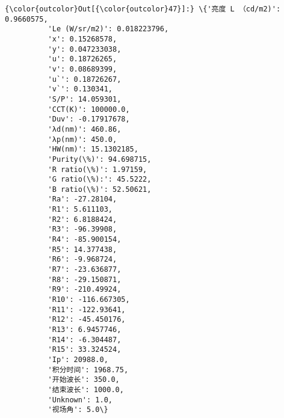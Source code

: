 \documentclass[11pt]{article}
\begin{document}
\begin{Verbatim}[commandchars=\\\{\}]
{\color{outcolor}Out[{\color{outcolor}47}]:} \{'亮度 L （cd/m2)': 0.9660575,
          'Le (W/sr/m2)': 0.018223796,
          'x': 0.15268578,
          'y': 0.047233038,
          'u': 0.18726265,
          'v': 0.08689399,
          'u`': 0.18726267,
          'v`': 0.130341,
          'S/P': 14.059301,
          'CCT(K)': 100000.0,
          'Duv': -0.17917678,
          'λd(nm)': 460.86,
          'λp(nm)': 450.0,
          'HW(nm)': 15.1302185,
          'Purity(\%)': 94.698715,
          'R ratio(\%)': 1.97159,
          'G ratio(\%):': 45.5222,
          'B ratio(\%)': 52.50621,
          'Ra': -27.28104,
          'R1': 5.611103,
          'R2': 6.8188424,
          'R3': -96.39908,
          'R4': -85.900154,
          'R5': 14.377438,
          'R6': -9.968724,
          'R7': -23.636877,
          'R8': -29.150871,
          'R9': -210.49924,
          'R10': -116.667305,
          'R11': -122.93641,
          'R12': -45.450176,
          'R13': 6.9457746,
          'R14': -6.304487,
          'R15': 33.324524,
          'Ip': 20988.0,
          '积分时间': 1968.75,
          '开始波长': 350.0,
          '结束波长': 1000.0,
          'Unknown': 1.0,
          '视场角': 5.0\}
\end{Verbatim}
            

    
    
    
    
\end{document}
